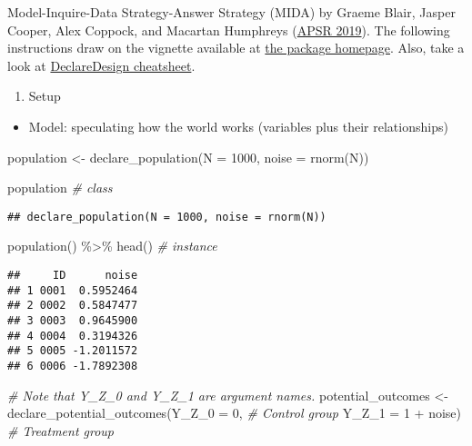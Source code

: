 \documentclass[
]{book}
\newenvironment{Shaded}{\begin{snugshade}}{\end{snugshade}}
\newcommand{\AttributeTok}[1]{\textcolor[rgb]{0.77,0.63,0.00}{#1}}
\newcommand{\CommentTok}[1]{\textcolor[rgb]{0.56,0.35,0.01}{\textit{#1}}}
\newcommand{\DecValTok}[1]{\textcolor[rgb]{0.00,0.00,0.81}{#1}}
\newcommand{\FunctionTok}[1]{\textcolor[rgb]{0.00,0.00,0.00}{#1}}
\newcommand{\NormalTok}[1]{#1}
\newcommand{\OtherTok}[1]{\textcolor[rgb]{0.56,0.35,0.01}{#1}}
\newcommand{\SpecialCharTok}[1]{\textcolor[rgb]{0.00,0.00,0.00}{#1}}
\providecommand{\tightlist}{%
  \setlength{\itemsep}{0pt}\setlength{\parskip}{0pt}}
\begin{document}
Model-Inquire-Data Strategy-Answer Strategy (MIDA) by Graeme Blair, Jasper Cooper, Alex Coppock, and Macartan Humphreys (\href{https://declaredesign.org/declare.pdf}{APSR 2019}). The following instructions draw on the vignette available at \href{https://declaredesign.org/mida/}{the package homepage}. Also, take a look at \href{https://github.com/rstudio/cheatsheets/blob/master/declaredesign.pdf}{DeclareDesign cheatsheet}.

\begin{enumerate}
\def\labelenumi{\arabic{enumi}.}
\tightlist
\item
  Setup
\end{enumerate}

\begin{itemize}
\tightlist
\item
  Model: speculating how the world works (variables plus their relationships)
\end{itemize}

\begin{Shaded}
\begin{Highlighting}[]
\NormalTok{population }\OtherTok{\textless{}{-}} \FunctionTok{declare\_population}\NormalTok{(}\AttributeTok{N =} \DecValTok{1000}\NormalTok{, }
                                 \AttributeTok{noise =} \FunctionTok{rnorm}\NormalTok{(N))}

\NormalTok{population }\CommentTok{\# class }
\end{Highlighting}
\end{Shaded}

\begin{verbatim}
## declare_population(N = 1000, noise = rnorm(N))
\end{verbatim}

\begin{Shaded}
\begin{Highlighting}[]
\FunctionTok{population}\NormalTok{() }\SpecialCharTok{\%\textgreater{}\%} \FunctionTok{head}\NormalTok{() }\CommentTok{\# instance }
\end{Highlighting}
\end{Shaded}

\begin{verbatim}
##     ID      noise
## 1 0001  0.5952464
## 2 0002  0.5847477
## 3 0003  0.9645900
## 4 0004  0.3194326
## 5 0005 -1.2011572
## 6 0006 -1.7892308
\end{verbatim}

\begin{Shaded}
\begin{Highlighting}[]
\CommentTok{\# Note that Y\_Z\_0 and Y\_Z\_1 are argument names. }
\NormalTok{potential\_outcomes }\OtherTok{\textless{}{-}} \FunctionTok{declare\_potential\_outcomes}\NormalTok{(}\AttributeTok{Y\_Z\_0 =} \DecValTok{0}\NormalTok{, }\CommentTok{\# Control group }
                                                 \AttributeTok{Y\_Z\_1 =} \DecValTok{1} \SpecialCharTok{+}\NormalTok{ noise) }\CommentTok{\# Treatment group }
\end{Highlighting}
\end{Shaded}
\end{document}
